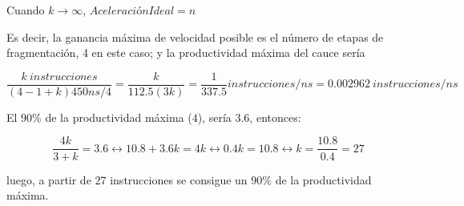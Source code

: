 \documentclass[a4paper, 11pt]{article}
\begin{document}
  Cuando $k\rightarrow \infty$, $AceleraciónIdeal = n$ 

Es decir, la ganancia máxima de velocidad posible es el número de etapas de fragmentación, 4 en este caso; y la productividad máxima del cauce sería 

$$ \frac{k \ instrucciones}{(4-1+k)450ns/4} = \frac{k}{112.5(3k)} = \frac{1}{337.5} instrucciones/ns = 0.002962 \ instrucciones/ns  $$ 

El $90\%$ de la productividad máxima ($4$), sería $3.6$, entonces: 

$$\frac{4k}{3+k} = 3.6 \leftrightarrow 10.8 + 3.6k = 4k \leftrightarrow 0.4k = 10.8 \leftrightarrow k = \frac{10.8}{0.4} = 27$$

luego, a partir de 27 instrucciones se consigue un $90\%$ de la productividad máxima. 
\end{document}
